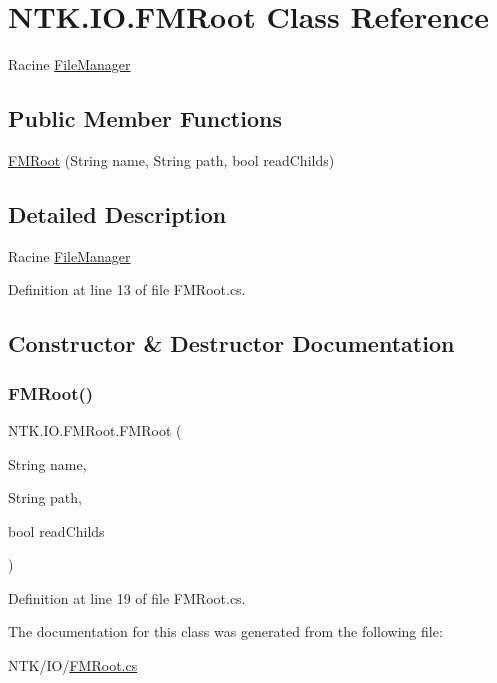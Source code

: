 \hypertarget{class_n_t_k_1_1_i_o_1_1_f_m_root}{}\section{N\+T\+K.\+I\+O.\+F\+M\+Root Class Reference}
\label{class_n_t_k_1_1_i_o_1_1_f_m_root}


Racine \mbox{\hyperlink{class_n_t_k_1_1_i_o_1_1_file_manager}{File\+Manager}}  


\subsection*{Public Member Functions}
\begin{DoxyCompactItemize}
\item 
\mbox{\hyperlink{class_n_t_k_1_1_i_o_1_1_f_m_root_a42831649028d76541adf38f44f0c9faf}{F\+M\+Root}} (String name, String path, bool read\+Childs)
\end{DoxyCompactItemize}


\subsection{Detailed Description}
Racine \mbox{\hyperlink{class_n_t_k_1_1_i_o_1_1_file_manager}{File\+Manager}} 



Definition at line 13 of file F\+M\+Root.\+cs.



\subsection{Constructor \& Destructor Documentation}
\mbox{\label{class_n_t_k_1_1_i_o_1_1_f_m_root_a42831649028d76541adf38f44f0c9faf}} 
\subsubsection{\texorpdfstring{FMRoot()}{FMRoot()}}
{\footnotesize\ttfamily N\+T\+K.\+I\+O.\+F\+M\+Root.\+F\+M\+Root (\begin{DoxyParamCaption}\item[{String}]{name,  }\item[{String}]{path,  }\item[{bool}]{read\+Childs }\end{DoxyParamCaption})}



Definition at line 19 of file F\+M\+Root.\+cs.



The documentation for this class was generated from the following file\+:\begin{DoxyCompactItemize}
\item 
N\+T\+K/\+I\+O/\mbox{\hyperlink{_f_m_root_8cs}{F\+M\+Root.\+cs}}\end{DoxyCompactItemize}
